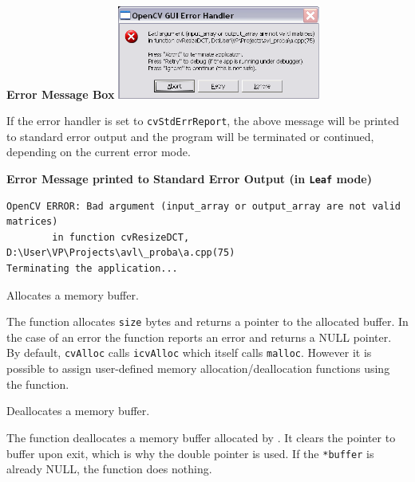\textbf{Error Message Box}
\includegraphics[width=0.5\textwidth]{pics/errmsg.png}

If the error handler is set to \texttt{cvStdErrReport}, the above message will be printed to standard error output and the program will be terminated or continued, depending on the current error mode.

\textbf{Error Message printed to Standard Error Output (in \texttt{Leaf} mode)}

\begin{lstlisting}
OpenCV ERROR: Bad argument (input_array or output_array are not valid matrices)
        in function cvResizeDCT, D:\User\VP\Projects\avl\_proba\a.cpp(75)
Terminating the application...
\end{lstlisting}

Allocates a memory buffer.


\begin{description}
\end{description}

The function allocates \texttt{size} bytes and returns
a pointer to the allocated buffer. In the case of an error the function reports an
error and returns a NULL pointer. By default, \texttt{cvAlloc} calls
\texttt{icvAlloc} which
itself calls \texttt{malloc}. However it is possible to assign user-defined memory
allocation/deallocation functions using the  function.

Deallocates a memory buffer.


\begin{description}
\end{description}

The function deallocates a memory buffer allocated by
. It clears the pointer to buffer upon exit, which is why
the double pointer is used. If the \texttt{*buffer} is already NULL, the function
does nothing.

